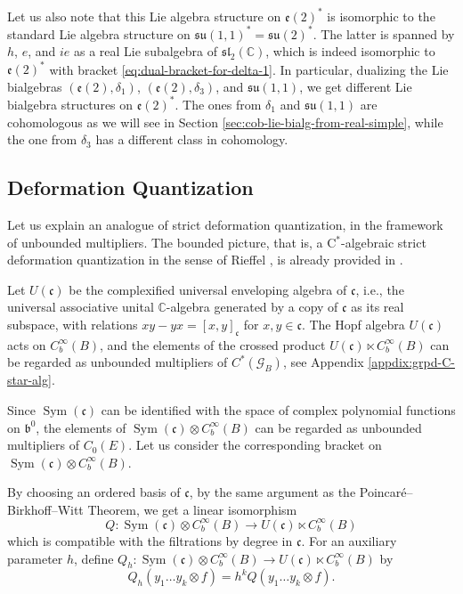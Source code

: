 \documentclass[a4paper,11pt]{amsart}
\newcommand{\C}{\mathbb C}
\newcommand{\s}[1]{\mathcal{#1}}
\newcommand{\fr}[1]{\mathfrak{#1}}
\DeclareMathOperator{\Sym}{Sym}
\theoremstyle{definition}
\theoremstyle{remark}
\begin{document}
Let us also note that this Lie algebra structure on $\fr{e}(2)^*$ is isomorphic to the standard Lie algebra structure on $\fr{su}(1,1)^* = \fr{su}(2)^*$.
The latter is spanned by $h$, $e$, and $i e$ as a real Lie subalgebra of $\fr{sl}_2(\C)$, which is indeed isomorphic to $\fr e(2)^*$ with bracket \eqref{eq:dual-bracket-for-delta-1}.
In particular, dualizing the Lie bialgebras $(\fr{e}(2), \delta_1)$, $(\fr{e}(2), \delta_3)$, and $\fr{su}(1,1)$, we get different Lie bialgebra structures on $\fr{e}(2)^*$.
The ones from $\delta_1$ and $\fr{su}(1,1)$ are cohomologous as we will see in Section \ref{sec:cob-lie-bialg-from-real-simple}, while the one from $\delta_3$ has a different class in cohomology.

\subsection{Deformation Quantization}


Let us explain an analogue of strict deformation quantization, in the framework of unbounded multipliers.
The bounded picture, that is, a C$^*$-algebraic strict deformation quantization in the sense of Rieffel \cite{MR1292010}, is already provided in \cite{MR1722129}.

Let $U(\fr{c})$ be the complexified universal enveloping algebra of $\fr{c}$, i.e., the universal associative unital $\C$-algebra generated by a copy of $\fr{c}$ as its real subspace, with relations $x y - y x = [x, y]_{\fr{c}}$ for $x, y \in \fr{c}$.
The Hopf algebra $U(\fr{c})$ acts on $C^\infty_b(B)$, and the elements of the crossed product $U(\fr{c}) \ltimes C^\infty_b(B)$ can be regarded as unbounded multipliers of $C^*(\s G_B)$, see Appendix \ref{appdix:grpd-C-star-alg}.

Since $\Sym(\fr{c})$ can be identified with the space of complex polynomial functions on $\fr{b}^0$, the elements of $\Sym(\fr{c}) \otimes C^\infty_b(B)$ can be regarded as unbounded multipliers of $C_0(E)$.
Let us consider the corresponding bracket on $\Sym(\fr{c}) \otimes C^\infty_b(B)$.

By choosing an ordered basis of $\fr{c}$, by the same argument as the Poincaré--Birkhoff--Witt Theorem, we get a linear isomorphism
\[
Q\colon \Sym(\fr{c}) \otimes C^\infty_b(B) \to U(\fr{c}) \ltimes C^\infty_b(B)
\]
which is compatible with the filtrations by degree in $\fr{c}$.
For an auxiliary parameter $h$, define $Q_h\colon \Sym(\fr{c}) \otimes C^\infty_b(B) \to U(\fr{c}) \ltimes C^\infty_b(B)$ by
\[
Q_h(y_1 \dots y_k \otimes f) = h^k Q(y_1 \dots y_k \otimes f).
\]
\end{document}
